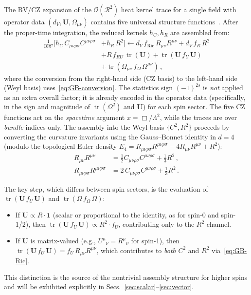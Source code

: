 \documentclass[aps,prd,twocolumn,superscriptaddress,nofootinbib,floatfix]{revtex4-2}
\theoremstyle{definition}
\theoremstyle{remark}
\newcommand{\Weylsq}{C_{\mu\nu\rho\sigma}C^{\mu\nu\rho\sigma}}
\newcommand{\Ricsq}{R_{\mu\nu}R^{\mu\nu}}
\newcommand{\Riemsq}{R_{\mu\nu\rho\sigma}R^{\mu\nu\rho\sigma}}
\newcommand{\tr}{\operatorname{tr}}
\begin{document}
The BV/CZ expansion of the $\mathcal{O}(\mathcal{R}^2)$ heat kernel trace
for a single field with operator data
$(d_V, \mathbf{U}, \Omega_{\mu\nu})$ contains five universal structure
functions~\cite{Barvinsky:1987uw,Codello:2012kq}. After the proper-time
integration, the reduced kernels $h_C, h_R$ are assembled from:
\begin{align}
  \frac{1}{16\pi^2}\bigl[h_C\,\Weylsq &+ h_R\,R^2\bigr]
  \longleftarrow
  d_V\,f_{\text{Ric}}\,\Ricsq
  + d_V\,f_R\,R^2  \nonumber\\
  &+ R\,f_{RU}\,\tr(\mathbf{U})
  + \tr(\mathbf{U}\,f_U\,\mathbf{U})  \nonumber\\
  &+ \tr(\Omega_{\mu\nu}\,f_\Omega\,\Omega^{\mu\nu})\,,
  \label{eq:CZ-expansion}
\end{align}
where the conversion from the right-hand side (CZ basis) to the left-hand
side (Weyl basis) uses~\eqref{eq:GB-conversion}. The statistics sign
$(-1)^{2s}$ is \emph{not} applied as an extra overall factor; it is
already encoded in the operator data (specifically, in the sign and magnitude
of $\tr(\Omega^2)$ and $\mathbf{U}$) for each spin sector.
The five CZ functions act on the \emph{spacetime} argument
$x = \Box/\Lambda^2$, while the traces are over \emph{bundle} indices only.
The assembly into the Weyl basis $\{C^2, R^2\}$ proceeds by converting the
curvature invariants using the Gauss--Bonnet identity in $d = 4$ (modulo the
topological Euler density
$E_4 = \Riemsq - 4\Ricsq + R^2$):
\begin{subequations}
\label{eq:GB-conversion}
\begin{align}
  \Ricsq &= \tfrac{1}{2}\Weylsq + \tfrac{1}{3}R^2\,,
  \label{eq:GB-Ric}\\
  \Riemsq &= 2\,\Weylsq + \tfrac{1}{3}R^2\,.
  \label{eq:GB-Riem}
\end{align}
\end{subequations}

The key step, which differs between spin sectors, is the evaluation of
$\tr(\mathbf{U}\,f_U\,\mathbf{U})$ and
$\tr(\Omega\,f_\Omega\,\Omega)$:
\begin{itemize}
\item If $\mathbf{U} \propto R\cdot\mathbf{1}$ (scalar or proportional to
  the identity, as for spin-0 and spin-1/2), then
  $\tr(\mathbf{U}\,f_U\,\mathbf{U}) \propto R^2 \cdot f_U$, contributing
  only to the $R^2$ channel.
\item If $\mathbf{U}$ is matrix-valued (e.g., $U^\mu{}_\nu = R^\mu{}_\nu$
  for spin-1), then
  $\tr(\mathbf{U}\,f_U\,\mathbf{U}) = f_U\,\Ricsq$, which contributes to
  \emph{both} $C^2$ and $R^2$ via~\eqref{eq:GB-Ric}.
\end{itemize}
This distinction is the source of the nontrivial assembly structure for
higher spins and will be exhibited explicitly in
Secs.~\ref{sec:scalar}--\ref{sec:vector}.
\end{document}
